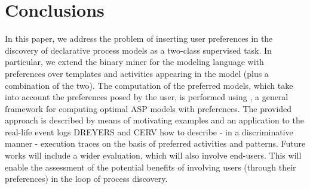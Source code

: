 

\section{Conclusions}
\label{sec:conclusions}

In this paper, we address the problem of inserting user preferences in the discovery of declarative process models as a two-class supervised task. In particular, we extend the \nd binary miner for the \declare modeling language with preferences over \declare templates and activities appearing in the model (plus a combination of the two). 
The computation of the preferred models, which take into account the preferences posed by the user, is performed using \asprin, a general framework for computing optimal ASP models with preferences. The provided approach is described by means of motivating examples and an application to the real-life event logs DREYERS and CERV  how to describe - in a discriminative manner - execution traces on the basis of preferred %
activities and \declare patterns. Future works will include a wider evaluation, which will also involve end-users. This will enable the assessment of the potential benefits of involving users (through their preferences) in the loop of process discovery.

